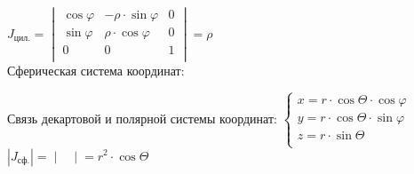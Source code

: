 $J_\text{цил.}  = 
\begin{vmatrix}
	\cos{\varphi} & -\rho \cdot \sin{\varphi} & 0 \\
	\sin{\varphi} & \rho \cdot \cos{\varphi} & 0 \\
	0 & 0 & 1 \\
\end{vmatrix} = \rho$ \\


Сферическая система координат:

Связь декартовой и полярной системы координат:
$\begin{cases}
	x = r \cdot \cos{\Theta} \cdot \cos{\varphi} \\
	y = r \cdot \cos{\Theta} \cdot \sin{\varphi} \\
	z = r \cdot \sin{\Theta} \\
\end{cases} $ \\

$\left| J_\text{сф.}  \right| = 
\begin{vmatrix}

\end{vmatrix} = r^2 \cdot \cos{\Theta}$






























